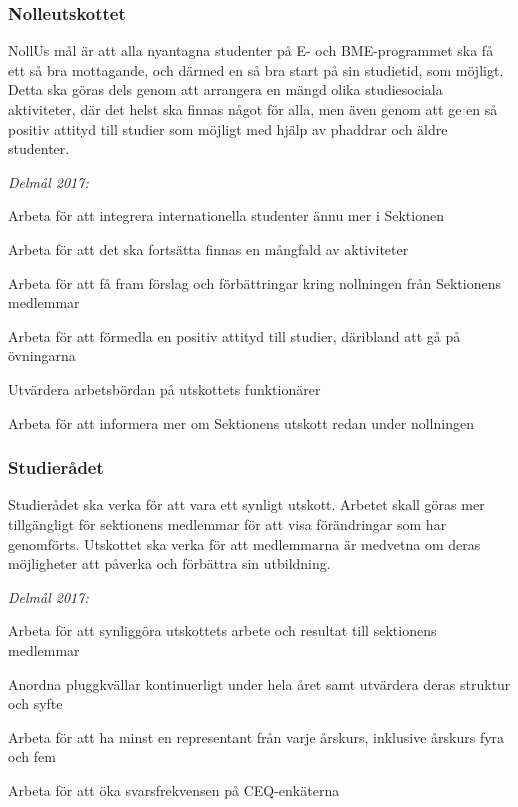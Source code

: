 \documentclass[../_main/handlingar.tex]{subfiles}
\begin{document}
\newpage

\subsubsection*{Nolleutskottet}
NollUs mål är att alla nyantagna studenter på E- och BME-programmet ska få ett så bra mottagande, och därmed en så bra start på sin studietid, som möjligt. Detta ska göras dels genom att arrangera en mängd olika studiesociala aktiviteter, där det helst ska finnas något för alla, men även genom att ge en så positiv attityd till studier som möjligt med hjälp av phaddrar och äldre studenter.

\emph{Delmål 2017:}
\begin{dashlist}
    \item Arbeta för att integrera internationella studenter ännu mer i Sektionen
    \item Arbeta för att det ska fortsätta finnas en mångfald av aktiviteter
    \item Arbeta för att få fram förslag och förbättringar kring nollningen från Sektionens medlemmar
    \item Arbeta för att förmedla en positiv attityd till studier, däribland att gå på övningarna
    \item Utvärdera arbetsbördan på utskottets funktionärer
    \item Arbeta för att informera mer om Sektionens utskott redan under nollningen
\end{dashlist}

\subsubsection*{Studierådet}
Studierådet ska verka för att vara ett synligt utskott. Arbetet skall göras mer tillgängligt för sektionens medlemmar för att visa förändringar som har genomförts. Utskottet ska verka för att medlemmarna är medvetna om deras möjligheter att påverka och förbättra sin utbildning.

\emph{Delmål 2017:}
\begin{dashlist}
    \item Arbeta för att synliggöra utskottets arbete och resultat till sektionens medlemmar
    \item Anordna pluggkvällar kontinuerligt under hela året samt utvärdera deras struktur och syfte
    \item Arbeta för att ha minst en representant från varje årskurs, inklusive årskurs fyra och fem
    \item Arbeta för att öka svarsfrekvensen på CEQ-enkäterna
\end{dashlist}

\newpage
\end{document}
